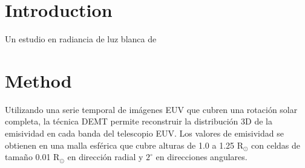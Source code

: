 \documentclass[baaa]{baaa}
\begin{document}
\maketitle

\section{Introduction}
\label{intro}


Un estudio en radiancia de luz blanca de \cite{awsom}%

\section{Method}

Utilizando una serie temporal de imágenes EUV que cubren una rotación solar completa, la técnica DEMT permite reconstruir la distribución 3D de la emisividad en cada banda del telescopio EUV. Los valores de emisividad se obtienen en una malla esférica que cubre alturas de 1.0 a 1.25 R$_\odot$ con celdas de tamaño 0.01 R$_\odot$ en dirección radial y $2^\circ$ en direcciones angulares.
\end{document}
